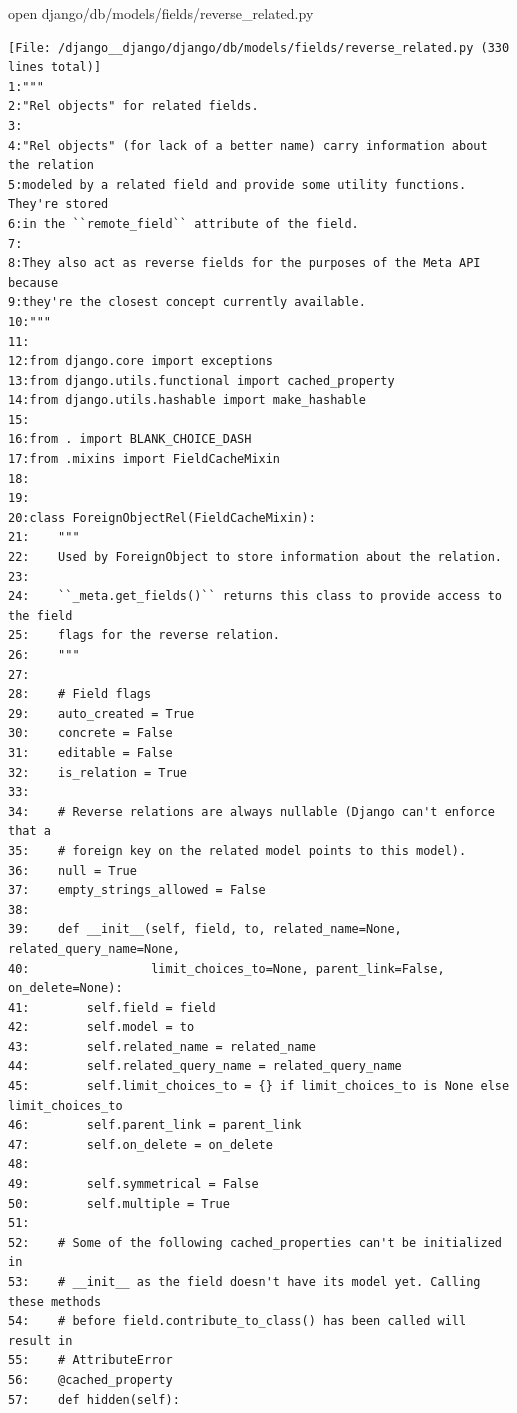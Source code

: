 {\begin{agentbox}
\hrulefill
\begin{CodeVerbatim}[breaklines=true, breakanywhere=true]
open django/db/models/fields/reverse_related.py
\end{CodeVerbatim}
\end{agentbox}
\begin{observationbox}\begin{Verbatim}[breaklines=true, breakanywhere=true]
[File: /django__django/django/db/models/fields/reverse_related.py (330 lines total)]
1:"""
2:"Rel objects" for related fields.
3:
4:"Rel objects" (for lack of a better name) carry information about the relation
5:modeled by a related field and provide some utility functions. They're stored
6:in the ``remote_field`` attribute of the field.
7:
8:They also act as reverse fields for the purposes of the Meta API because
9:they're the closest concept currently available.
10:"""
11:
12:from django.core import exceptions
13:from django.utils.functional import cached_property
14:from django.utils.hashable import make_hashable
15:
16:from . import BLANK_CHOICE_DASH
17:from .mixins import FieldCacheMixin
18:
19:
20:class ForeignObjectRel(FieldCacheMixin):
21:    """
22:    Used by ForeignObject to store information about the relation.
23:
24:    ``_meta.get_fields()`` returns this class to provide access to the field
25:    flags for the reverse relation.
26:    """
27:
28:    # Field flags
29:    auto_created = True
30:    concrete = False
31:    editable = False
32:    is_relation = True
33:
34:    # Reverse relations are always nullable (Django can't enforce that a
35:    # foreign key on the related model points to this model).
36:    null = True
37:    empty_strings_allowed = False
38:
39:    def __init__(self, field, to, related_name=None, related_query_name=None,
40:                 limit_choices_to=None, parent_link=False, on_delete=None):
41:        self.field = field
42:        self.model = to
43:        self.related_name = related_name
44:        self.related_query_name = related_query_name
45:        self.limit_choices_to = {} if limit_choices_to is None else limit_choices_to
46:        self.parent_link = parent_link
47:        self.on_delete = on_delete
48:
49:        self.symmetrical = False
50:        self.multiple = True
51:
52:    # Some of the following cached_properties can't be initialized in
53:    # __init__ as the field doesn't have its model yet. Calling these methods
54:    # before field.contribute_to_class() has been called will result in
55:    # AttributeError
56:    @cached_property
57:    def hidden(self):

\end{Verbatim}
\end{observationbox}}
